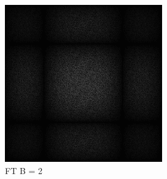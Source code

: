 \begin{figure}[H]
    \begin{tcolorbox}[boxrule=4pt,sharp corners=downhill,title=Verschiedene Blockgrößen]
    \centering
    \begin{subfigure}[b]{0.2\linewidth}
      \includegraphics[width=\linewidth]{content/TemporalerAlg/Bilder/Sorting/DiffDimensions/2/seed_debug_5.0_small.png}
       \caption{FT B = 2}
       \label{pic:fftB_2}
    \end{subfigure}
    \begin{subfigure}[b]{0.2\linewidth}

\end{subfigure}
\end{tcolorbox}
\end{figure}
